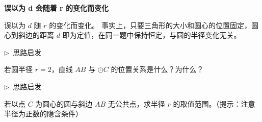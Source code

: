 \documentclass{exam-zh}
\newcommand{\edukai}{\kaishu}
\newcommand{\eduSubTitle}[1]{%
  \needspace{4\baselineskip}%
  \vspace{1mm}
  {\color{edu-blue}\bfseries #1}\par
  \vspace{1mm}
}
\newenvironment{eduAuxItem}[1]{%
  \needspace{4\baselineskip}%
  \vspace{2mm}
  \par\noindent
  \hangindent=8mm\hangafter=1
  {\color{edu-blue}\edukai $\triangleright$~#1}\enspace
  \begingroup
  \color{edu-ink}
  \edukai
}{%
  \endgroup
  \par
  \vspace{4mm}
}
\begin{document}
\begin{eduMistakeBox}
\eduSubTitle{误以为 d 会随着 r 的变化而变化}误以为 $d$ 随 $r$ 的变化而变化。
事实上，只要三角形的大小和圆心的位置固定，圆心到斜边的距离 $d$ 即为定值，在同一题中保持恒定，与圆的半径变化无关。
\end{eduMistakeBox}




\begin{eduAuxItem}{思路启发}
若圆半径 $r = 2$，直线 $AB$ 与 $\odot C$ 的位置关系是什么？为什么？\end{eduAuxItem}




\begin{eduAuxItem}{思路启发}
若以点 $C$ 为圆心的圆与斜边 $AB$ 无公共点，求半径 $r$ 的取值范围。（提示：注意半径为正数的隐含条件）\end{eduAuxItem}
\end{document}
